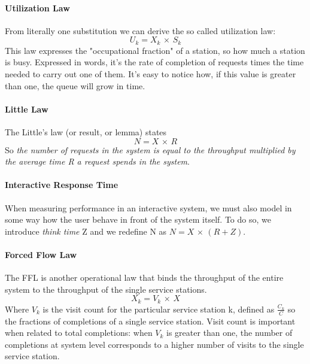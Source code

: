 \documentclass{article}
\begin{document}
				\paragraph{Utilization Law}
					From literally one substitution we can derive the so called utilization law:
					\begin{equation}
						U_k = X_k \,\times\, S_k
					\end{equation} 
					This law expresses the "occupational fraction" of a station, so how much a station is busy. Expressed in words, it's the rate of completion of requests times the time needed to carry out one of them. It's easy to notice how, if this value is greater than one, the queue will grow in time.
					
				\paragraph{Little Law}
					The Little's law (or result, or lemma) states
					\begin{equation}
						N = X \,\times\,R
					\end{equation}
					So \emph{the number of requests in the system is equal to the throughput multiplied by the average time R a request spends in the system}.
					
				\paragraph{Interactive Response Time}
					When measuring performance in an interactive system, we must also model in some way how the user behave in front of the system itself. To do so, we introduce \emph{think time} Z and we redefine N as $N = X \,\times\, (R + Z) $.

				\paragraph{Forced Flow Law}
					The FFL is another operational law that binds the throughput of the entire system to the throughput of the single service stations.
					\begin{equation}
						X_k = V_k \,\times\, X
					\end{equation}
					Where $V_k$ is the visit count for the particular service station k, defined as $\frac{C_k}{C}$ so the fractions of completions of a single service station. Visit count is important when related to total completions: when $V_k$ is greater than one, the number of completions at system level corresponds to a higher number of visits to the single service station.\\
					
\end{document}
